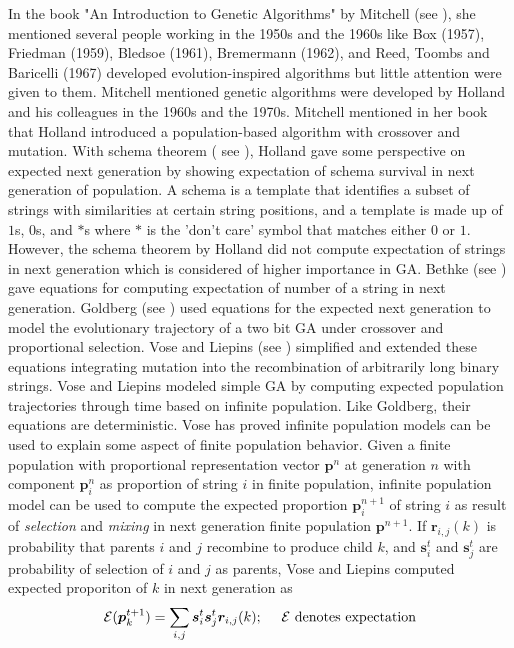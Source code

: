In the book "An Introduction to Genetic Algorithms" by Mitchell (see \cite{Mitchell1999}), she mentioned several people working in the 1950s and the 1960s like Box (1957), Friedman (1959),
 Bledsoe (1961), Bremermann (1962), and Reed, Toombs and Baricelli (1967) developed evolution-inspired algorithms but little attention were given to them. Mitchell mentioned genetic algorithms were developed by Holland and his colleagues in the 1960s and the 1970s. Mitchell mentioned in her book that Holland introduced a population-based algorithm with crossover and mutation. With schema theorem ( see \cite{Holland1975}), Holland gave some perspective on expected next generation by showing expectation of schema survival in next generation of population. A schema is a template that identifies a subset of strings with similarities at certain string positions, and a template is made up of $1$s, $0$s, and $\ast$s where 
$\ast$ is the 'don't care' symbol that matches either $0$ or $1$. However, the schema theorem by Holland did not compute expectation of strings in next generation which is considered of higher importance in GA. Bethke (see \cite{Bethke1981}) gave equations for computing expectation of number of a string in next generation. Goldberg (see \cite{Goldberg1987}) used equations 
for the expected next generation to model the evolutionary trajectory of a two bit GA under crossover and proportional selection. Vose and Liepins (see \cite{VoseLiepins1991}) simplified and extended these equations integrating mutation into the recombination of arbitrarily long binary strings. Vose and Liepins modeled simple GA by computing expected population trajectories through time based on infinite population. Like Goldberg, their equations are deterministic. 
Vose has proved infinite population models can be used  to explain some aspect of finite population behavior. 
Given a finite population with proportional representation vector $\bm{p}^n$ at generation $n$ with 
component $\bm{p}_i^n$ as proportion of string $i$ in finite population, infinite population model 
can be used to compute the expected proportion $\bm{p}_i^{n+1}$ of string $i$ as result of \textit{selection} and 
\textit{mixing} in next generation finite population $\bm{p}^{n+1}$.  
If $\bm{r}_{i,j}(k)$ is probability that parents $i$ and $j$ recombine to produce child $k$, and $\bm{s}_i^t$ and $\bm{s}_j^t$ 
are probability of selection of $i$ and $j$ as parents, Vose and Liepins computed expected proporiton of $k$ in next generation as
\[
\mathcal{E}(\bm{p}_k^{t+1}) = \sum_{i,j} \bm{s}_i^t \bm{s}_j^t \bm{r}_{i,j}(k) ; \text{\hspace{10pt} $\mathcal{E}$ denotes expectation}
\]
